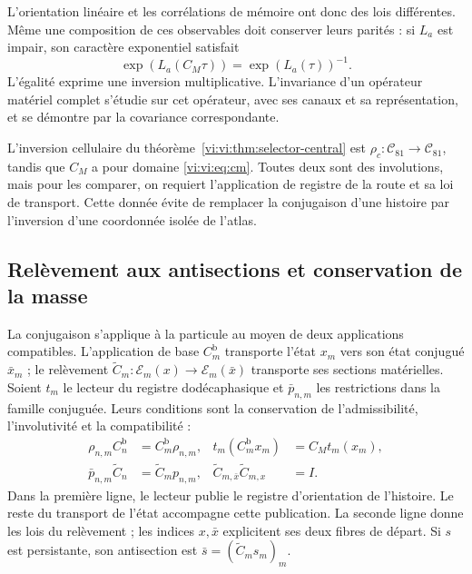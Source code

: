 L’orientation linéaire et les corrélations de mémoire ont donc
des lois différentes. Même une composition de ces observables doit
conserver leurs parités : si $L_a$ est impair, son caractère exponentiel
satisfait
\begin{equation}
 \exp(L_a(C_M\tau))=\exp(L_a(\tau))^{-1}.
 \label{vi:vi:eq:caracter-inverso}
\end{equation}
L’égalité exprime une inversion multiplicative. L’invariance d’un
opérateur matériel complet s’étudie sur cet opérateur, avec ses
canaux et sa représentation, et se démontre par la covariance
correspondante.

L’inversion cellulaire du théorème~\ref{vi:vi:thm:selector-central} est
$\rho_c:\mathcal C_{81}\to\mathcal C_{81}$, tandis que $C_M$ a pour
domaine \eqref{vi:vi:eq:cm}. Toutes deux sont des involutions, mais pour
les comparer, on requiert l’application de registre de la route et sa loi de
transport. Cette donnée évite de remplacer la conjugaison d’une histoire
par l’inversion d’une coordonnée isolée de l’atlas.

\subsection{Relèvement aux antisections et conservation de la masse}
\label{vi:vi:subsec:antisecciones}

La conjugaison s’applique à la particule au moyen de deux applications
compatibles. L’application de base $C_m^{\mathrm b}$ transporte l’état
$x_m$ vers son état conjugué $\bar x_m$ ; le relèvement
$\widetilde C_m:\mathscr E_m(x)\to\mathscr E_m(\bar x)$
transporte ses sections matérielles. Soient $t_m$ le lecteur du
registre dodécaphasique et $\bar p_{n,m}$ les restrictions dans la
famille conjuguée. Leurs conditions sont la conservation de
l’admissibilité, l’involutivité et la compatibilité :
\begin{equation}
 \begin{aligned}
 \rho_{n,m}C_n^{\mathrm b}&=C_m^{\mathrm b}\rho_{n,m},
 &t_m(C_m^{\mathrm b}x_m)&=C_Mt_m(x_m),\\
 \bar p_{n,m}\widetilde C_n&=\widetilde C_mp_{n,m},
 &\widetilde C_{m,\bar x}\widetilde C_{m,x}&=I.
 \end{aligned}
 \label{vi:vi:eq:levantamiento-cm}
\end{equation}
Dans la première ligne, le lecteur publie le registre d’orientation
de l’histoire. Le reste du transport de l’état accompagne cette
publication. La seconde ligne donne les lois du relèvement ;
les indices $x,\bar x$ explicitent ses deux fibres de départ.
Si $s$ est persistante, son antisection est
$\bar s=(\widetilde C_ms_m)_m$.

